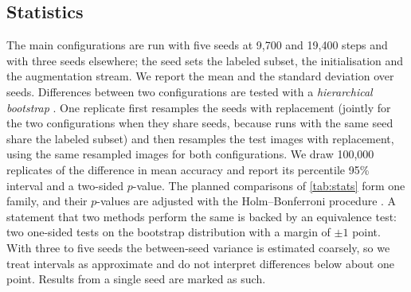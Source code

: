 \subsection{Statistics}
\label{sec:stats}
The main configurations are run with five seeds at 9,700 and 19,400 steps and with three seeds elsewhere;
the seed sets the labeled subset, the initialisation and the augmentation stream. We report the mean and
the standard deviation over seeds. Differences between two configurations are tested with a
\emph{hierarchical bootstrap} \citep{efron1993bootstrap}. One replicate first resamples the seeds with
replacement (jointly for the two configurations when they share seeds, because runs with the same seed share
the labeled subset) and then resamples the test images with replacement, using the same resampled images
for both configurations. We draw 100,000 replicates of the difference in mean accuracy and report its
percentile 95\% interval and a two-sided $p$-value. The  planned comparisons of
\cref{tab:stats} form one family, and their $p$-values are adjusted with the Holm--Bonferroni procedure
\citep{holm1979simple}. A statement that two methods perform the same is backed by an equivalence test: two
one-sided tests \citep{schuirmann1987comparison} on the bootstrap distribution with a margin of $\pm1$ point.
With three to five seeds the between-seed variance is estimated coarsely, so we treat intervals as
approximate and do not interpret differences below about one point. Results from a single seed are marked
as such.
